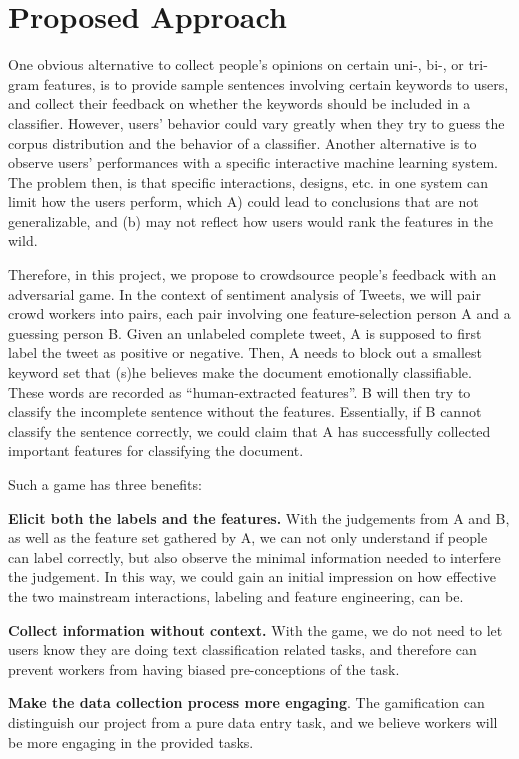 \section{Proposed Approach}

One obvious alternative to collect people's opinions on certain uni-, bi-, or tri-gram features, is to provide sample sentences involving certain keywords to users, and collect their feedback on whether the keywords should be included in a classifier. 
However, users' behavior could vary greatly when they try to guess the corpus distribution and the behavior of a classifier.
Another alternative is to observe users' performances with a specific interactive machine learning system. 
The problem then, is that specific interactions, designs, etc. in one system can limit how the users perform, which A) could lead to conclusions that are not generalizable, and (b) may not reflect how users would rank the features in the wild. 

Therefore, in this project, we propose to crowdsource people's feedback with an adversarial game. 
In the context of sentiment analysis of Tweets, we will pair crowd workers into pairs, each pair involving one feature-selection person A and a guessing person B.
Given an unlabeled complete tweet, A is supposed to first label the tweet as positive or negative. 
Then, A needs to block out a smallest keyword set that (s)he believes make the document emotionally classifiable. 
These words are recorded as ``human-extracted features''.
B will then try to classify the incomplete sentence without the features.
Essentially, if B cannot classify the sentence correctly, we could claim that A has successfully collected important features for classifying the document.

Such a game has three benefits:
\begin{compactenum}
	\item \textbf{Elicit both the labels and the features.} With the judgements from A and B, as well as the feature set gathered by A, we can not only understand if people can label correctly, but also observe the minimal information needed to interfere the judgement. In this way, we could gain an initial impression on how effective the two mainstream interactions, labeling and feature engineering, can be.
	\item \textbf{Collect information without context. }With the game, we do not need to let users know they are doing text classification related tasks, and therefore can prevent workers from having biased pre-conceptions of the task.
	\item \textbf{Make the data collection process more engaging}. The gamification can distinguish our project from a pure data entry task, and we believe workers will be more engaging in the provided tasks.
\end{compactenum}
 
